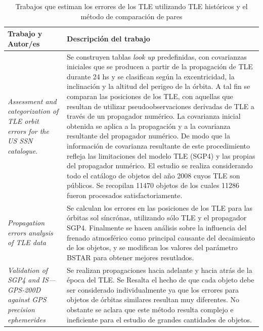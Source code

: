 \begin{table}[!h]
\caption[Estimaciones con TLE]{Trabajos que estiman los errores de los TLE utilizando TLE hist\'oricos y el m\'etodo de comparaci\'on de pares}
  \begin{tabular}{p{5cm}p{12cm}}
  \hline \hline
  Trabajo y Autor/es & Descripci\'on del trabajo \\
  \hline \hline
   {\it{Assessment and categorization of TLE orbit errors for the US SSN catalogue.}}  \citep{krag2007assessment} & Se construyen tablas {\it{look up}} predefinidas, con covarianzas iniciales que se producen a partir de la propagación de TLE durante 24 hs y se clasifican seg\'un la excentricidad, la inclinaci\'on y la altitud del perigeo de la \'orbita. A tal fin se comparan las posiciones de los TLE, con aquellas que resultan de utilizar pseudo\-observaciones derivadas de TLE a trav\'es de un propagador num\'erico. La covarianza inicial obtenida se aplica a la propagaci\'on y a la covarianza resultante del propagador num\'erico. De modo que la informaci\'on de covarianza resultante de este procedimiento refleja las limitaciones del modelo TLE (SGP4) y las propias del propagador num\'erico. El estudio se realiza considerando todo el cat\'alogo de objetos del a\~no 2008 cuyos TLE son p\'ublicos. Se recopilan 11470 objetos de los cuales 11286 fueron procesados satisfactoriamente.\\
  \hline
  {\it{Propagation errors analysis of TLE data}} \citep{wang2009propagation} & Se calculan los errores en las posiciones de los TLE para las \'orbitas sol s\'incr\'onas, utilizando s\'olo TLE y el propagador SGP4. Finalmente se hacen an\'alisis sobre la influencia del frenado atmosf\'erico como principal causante del decaimiento de los objetos, y se modifican los valores del par\'ametro BSTAR para obtener mejores resutlados.\\
  \hline
  {\it{Validation of SGP4 and IS—GPS-200D against GPS precision ephemerides}} \citep{kelso2007validation} & Se realizan propagaciones hacia adelante y hacia atr\'as de la \'epoca del TLE. Se Resalta el hecho de que cada objeto debe ser considerado individualmente ya que los errores para objetos de \'orbitas similares resultan muy diferentes. No obstante se aclara que este m\'etodo resulta complejo e ineficiente para el estudio de grandes cantidades de objetos.\\
  \hline
  \end{tabular}
  \label{tab:trabajosprecisas}
\end{table}



